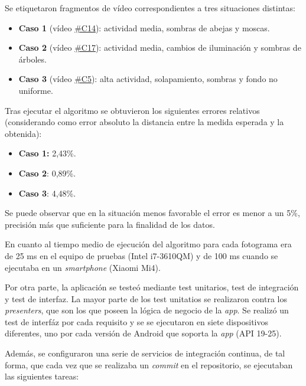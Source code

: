 Se etiquetaron fragmentos de vídeo correspondientes a tres situaciones
distintas:
\newpage
\begin{itemize}
\tightlist
\item
  \textbf{Caso 1} (vídeo \href{https://youtu.be/9pkPCnS2aRY}{\#C14}):
  actividad media, sombras de abejas y moscas.
\item
  \textbf{Caso 2} (vídeo \href{https://youtu.be/ENocXS3cEP0}{\#C17}):
  actividad media, cambios de iluminación y sombras de árboles.
\item
  \textbf{Caso 3} (vídeo \href{https://youtu.be/YjGX4mC7pO4}{\#C5}):
  alta actividad, solapamiento, sombras y fondo no uniforme.
\end{itemize}

Tras ejecutar el algoritmo se obtuvieron los siguientes errores
relativos (considerando como error absoluto la distancia entre la medida
esperada y la obtenida):

\begin{itemize}
\tightlist
\item
  \textbf{Caso 1:} 2,43\%.
\item
  \textbf{Caso 2}: 0,89\%.
\item
  \textbf{Caso 3}: 4,48\%.
\end{itemize}

Se puede observar que en la situación menos favorable el error es menor
a un 5\%, precisión más que suficiente para la finalidad de los datos.

En cuanto al tiempo medio de ejecución del algoritmo para cada fotograma
era de 25 ms en el equipo de pruebas (Intel i7-3610QM) y de 100 ms
cuando se ejecutaba en un \emph{smartphone} (Xiaomi Mi4).

Por otra parte, la aplicación se testeó mediante test unitarios, test de
integración y test de interfaz. La mayor parte de los test unitatios se
realizaron contra los \emph{presenters}, que son los que poseen la
lógica de negocio de la \emph{app}. Se realizó un test de interfáz por 
cada requisito y se se ejecutaron en siete dispositivos diferentes, uno por 
cada versión de Android que soporta la \emph{app} (API 19-25).

Además, se configuraron una serie de servicios de integración continua,
de tal forma, que cada vez que se realizaba un \emph{commit} en el
repositorio, se ejecutaban las siguientes tareas:

